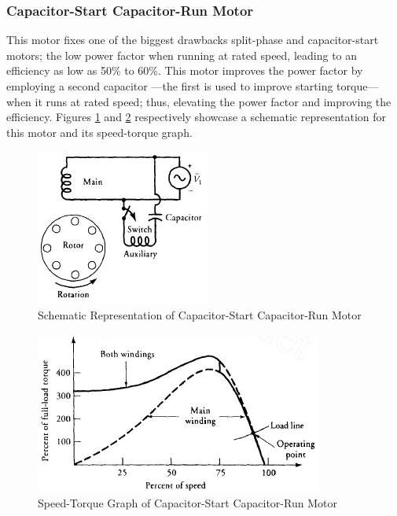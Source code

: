 \documentclass[journal]{IEEEtran}
\begin{document}
\subsubsection{Capacitor-Start Capacitor-Run Motor}
This motor fixes one of the biggest drawbacks split-phase and capacitor-start motors; the low power factor when running at rated speed, leading to an efficiency as low as 50\% to 60\%. This motor improves the power factor by employing a second capacitor —the first is used to improve starting torque— when it runs at rated speed; thus, elevating the power factor and improving the efficiency\cite{guru2007}. Figures \ref{fig:capstcaprunsch} and \ref{fig:capstcaprungraph} respectively showcase a schematic representation for this motor and its speed-torque graph.

\begin{figure}[h]
    \centering
    \includegraphics[scale=0.67]{Induction/cap_start_cap_run_sch.PNG}
    \caption{Schematic Representation of Capacitor-Start Capacitor-Run Motor \cite{guru2007}}
    \label{fig:capstcaprunsch}
\end{figure}
\begin{figure}[h]
    \centering
    \includegraphics[scale=0.57]{Induction/cap_start_cap_run_graph.PNG}
    \caption{Speed-Torque Graph of Capacitor-Start Capacitor-Run Motor \cite{guru2007}}
    \label{fig:capstcaprungraph}
\end{figure}
\end{document}
